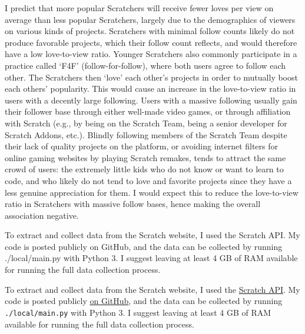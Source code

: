 \documentclass[12pt]{article}
\begin{document}
\begin{flushleft}
	I predict that more popular Scratchers will receive fewer loves per view on average than less popular Scratchers, largely due to the demographics of viewers on various kinds of projects. Scratchers with minimal follow counts likely do not produce favorable projects, which their follow count reflects, and would therefore have a low love-to-view ratio. Younger Scratchers also commonly participate in a practice called ‘F4F’ (follow-for-follow), where both users agree to follow each other. The Scratchers then ‘love’ each other’s projects in order to mutually boost each others’ popularity. This would cause an increase in the love-to-view ratio in users with a decently large following. Users with a massive following usually gain their follower base through either well-made video games, or through affiliation with Scratch (e.g., by being on the Scratch Team, being a senior developer for Scratch Addons, etc.). Blindly following members of the Scratch Team despite their lack of quality projects on the platform, or avoiding internet filters for online gaming websites by playing Scratch remakes, tends to attract the same crowd of users: the extremely little kids who do not know or want to learn to code, and who likely do not tend to love and favorite projects since they have a less genuine appreciation for them. I would expect this to reduce the love-to-view ratio in Scratchers with massive follow bases, hence making the overall association negative.
	
	To extract and collect data from the Scratch website, I used the Scratch API. My code is posted publicly on GitHub, and the data can be collected by running ./local/main.py with Python 3. I suggest leaving at least 4 GB of RAM available for running the full data collection process.
	
	To extract and collect data from the Scratch website, I used the \hyperlink{https://api.scratch.mit.edu/}{Scratch API}. My code is posted publicly \hyperlink{https://github.com/piano-miles/Scratch-Userdata}{on GitHub}, and the data can be collected by running \texttt{./local/main.py} with Python 3. I suggest leaving at least 4 GB of RAM available for running the full data collection process.
	

\end{flushleft}
\end{document}
